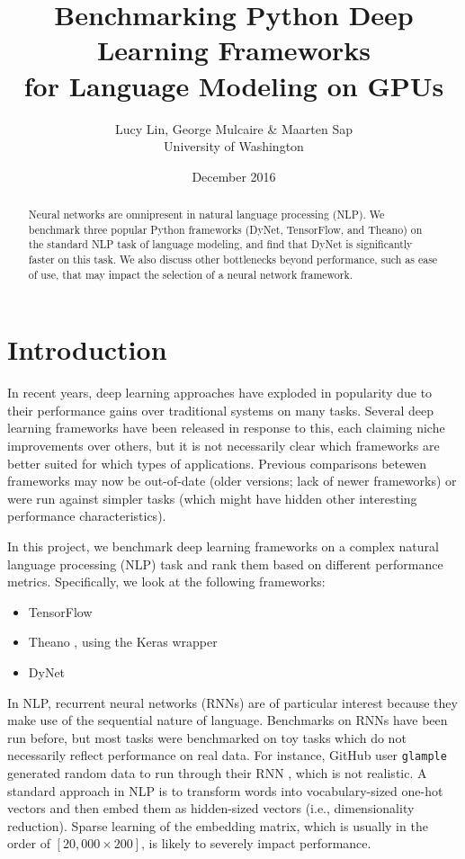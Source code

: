 \documentclass{article}
\title{Benchmarking Python Deep Learning Frameworks\\ for Language Modeling on GPUs}
\author{Lucy Lin, George Mulcaire \& Maarten Sap
\\University of Washington}
\date{December 2016}
\begin{document}
\maketitle

\begin{abstract}
Neural networks are omnipresent in natural language processing (NLP).
We benchmark three popular Python frameworks (DyNet, TensorFlow, and Theano) on the standard NLP task of language modeling, and find that DyNet is significantly faster on this task. We also discuss other bottlenecks beyond performance, such as ease of use, that may impact the selection of a neural network framework.
\end{abstract}


\section{Introduction}
In recent years, deep learning approaches have exploded in popularity due to their performance gains over traditional systems on many tasks. Several deep learning frameworks have been released in response to this, each claiming niche improvements over others, but it is not necessarily clear which frameworks are better suited for which types of applications. Previous comparisons betewen frameworks may now be out-of-date (older versions; lack of newer frameworks) or were run against simpler tasks (which might have hidden other interesting performance characteristics).

In this project, we benchmark deep learning frameworks on a complex natural language processing (NLP) task and rank them based on different performance metrics. Specifically, we look at the following frameworks:
\begin{itemize}
	\item TensorFlow \cite{tensorflow}
	\item Theano \cite{theano}, using the Keras wrapper \cite{keras}
	\item DyNet \cite{dynet}
\end{itemize}
In NLP, recurrent neural networks (RNNs) are of particular interest because they make use of the sequential nature of language. Benchmarks on RNNs have been run before, but most tasks were benchmarked on toy tasks which do not necessarily reflect performance on real data. For instance, GitHub user \verb!glample! generated random data to run through their RNN \cite{glample}, which is not realistic. A standard approach in NLP is to transform words into vocabulary-sized one-hot vectors and then embed them as hidden-sized vectors (i.e., dimensionality reduction). Sparse learning of the embedding matrix, which is usually in the order of $[20,000 \times 200]$, is likely to severely impact performance.
\end{document}
